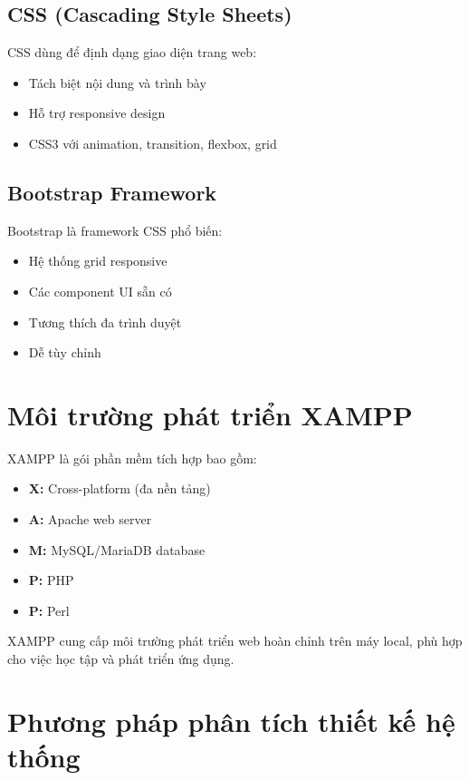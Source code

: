 \documentclass[a4paper,13pt]{extreport}
\begin{document}
\subsection{CSS (Cascading Style Sheets)}
CSS dùng để định dạng giao diện trang web:
\begin{itemize}
    \item Tách biệt nội dung và trình bày
    \item Hỗ trợ responsive design
    \item CSS3 với animation, transition, flexbox, grid
\end{itemize}

\subsection{Bootstrap Framework}
Bootstrap là framework CSS phổ biến:
\begin{itemize}
    \item Hệ thống grid responsive
    \item Các component UI sẵn có
    \item Tương thích đa trình duyệt
    \item Dễ tùy chỉnh
\end{itemize}

\section{Môi trường phát triển XAMPP}

XAMPP là gói phần mềm tích hợp bao gồm:
\begin{itemize}
    \item \textbf{X:} Cross-platform (đa nền tảng)
    \item \textbf{A:} Apache web server
    \item \textbf{M:} MySQL/MariaDB database
    \item \textbf{P:} PHP
    \item \textbf{P:} Perl
\end{itemize}

XAMPP cung cấp môi trường phát triển web hoàn chỉnh trên máy local, phù hợp cho việc học tập và phát triển ứng dụng.

\section{Phương pháp phân tích thiết kế hệ thống}
\end{document}
